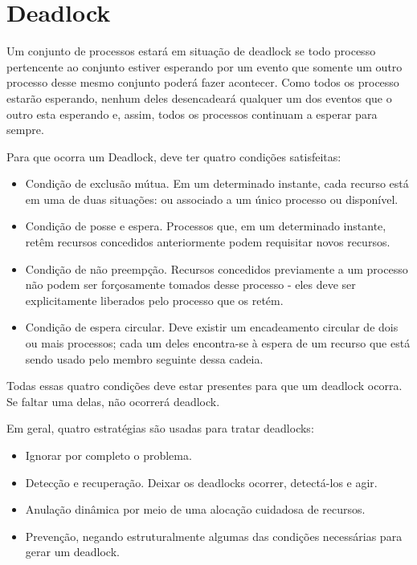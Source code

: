 \section{Deadlock}

Um conjunto de processos estará em situação de deadlock se todo processo pertencente ao conjunto 
estiver esperando por um evento que somente um outro processo desse mesmo conjunto poderá fazer 
acontecer. Como todos os processo estarão esperando, nenhum deles desencadeará qualquer um dos 
eventos que o outro esta esperando e, assim, todos os processos continuam a esperar para sempre.

Para que ocorra um Deadlock, deve ter quatro condições satisfeitas:

\begin{itemize}
\item Condição de exclusão mútua. Em um determinado instante, cada recurso está em uma de duas situações:
ou associado a um único processo ou disponível.
\item Condição de posse e espera. Processos que, em um determinado instante, retêm recursos concedidos
anteriormente podem requisitar novos recursos.
\item Condição de não preempção. Recursos concedidos previamente a um processo não podem ser 
forçosamente tomados desse processo - eles deve ser explicitamente liberados pelo processo que os retém.
\item Condição de espera circular. Deve existir um encadeamento circular de dois ou mais processos; cada um
deles encontra-se à espera de um recurso que está sendo usado pelo membro seguinte dessa cadeia.
\end{itemize}

Todas essas quatro condições deve estar presentes para que um deadlock ocorra. Se faltar
uma delas, não ocorrerá deadlock.

Em geral, quatro estratégias são usadas para tratar deadlocks:

\begin{itemize}
\item Ignorar por completo o problema.
\item Detecção e recuperação. Deixar os deadlocks ocorrer, detectá-los e agir.
\item Anulação dinâmica por meio de uma alocação cuidadosa de recursos.
\item Prevenção, negando estruturalmente algumas das condições necessárias para gerar um deadlock.
\end{itemize}

